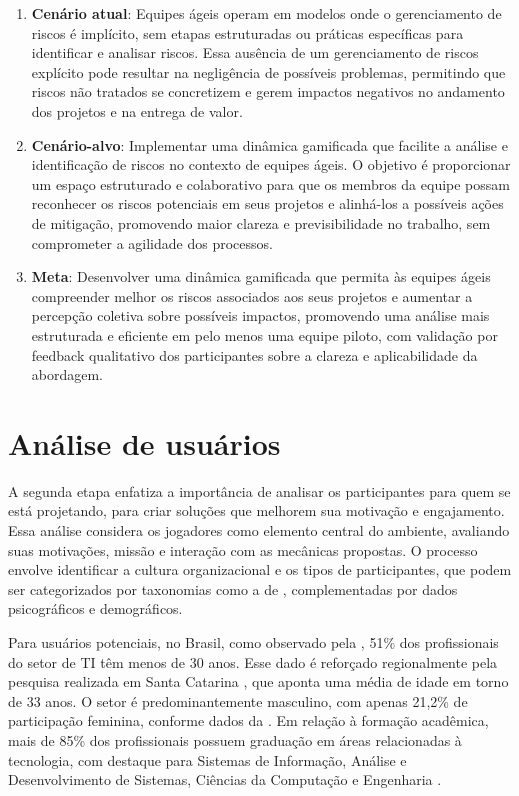 \documentclass[
	12pt,
	openright,
	twoside,
	a4paper,
	english,
	brazil
	]{abntex2}
\begin{document}
\begin{enumerate}
  \item \textbf{Cenário atual}: Equipes ágeis operam em modelos onde o gerenciamento de riscos é implícito, sem etapas estruturadas ou práticas específicas para identificar e analisar riscos. Essa ausência de um gerenciamento de riscos explícito pode resultar na negligência de possíveis problemas, permitindo que riscos não tratados se concretizem e gerem impactos negativos no andamento dos projetos e na entrega de valor. 
  \item \textbf{Cenário-alvo}: Implementar uma dinâmica gamificada que facilite a análise e identificação de riscos no contexto de equipes ágeis. O objetivo é proporcionar um espaço estruturado e colaborativo para que os membros da equipe possam reconhecer os riscos potenciais em seus projetos e alinhá-los a possíveis ações de mitigação, promovendo maior clareza e previsibilidade no trabalho, sem comprometer a agilidade dos processos. 
  \item \textbf{Meta}: Desenvolver uma dinâmica gamificada que permita às equipes ágeis compreender melhor os riscos associados aos seus projetos e aumentar a percepção coletiva sobre possíveis impactos, promovendo uma análise mais estruturada e eficiente em pelo menos uma equipe piloto, com validação por feedback qualitativo dos participantes sobre a clareza e aplicabilidade da abordagem.
\end{enumerate}

\section{Análise de usuários}

A segunda etapa enfatiza a importância de analisar os participantes para quem se está projetando, para criar soluções que melhorem sua motivação e engajamento. Essa análise considera os jogadores como elemento central do ambiente, avaliando suas motivações, missão e interação com as mecânicas propostas. O processo envolve identificar a cultura organizacional e os tipos de participantes, que podem ser categorizados por taxonomias como a de , complementadas por dados psicográficos e demográficos.

Para usuários potenciais, no Brasil, como observado pela , 51\% dos profissionais do setor de TI têm menos de 30 anos. Esse dado é reforçado regionalmente pela pesquisa realizada em Santa Catarina \cite{acate}, que aponta uma média de idade em torno de 33 anos. O setor é predominantemente masculino, com apenas 21,2\% de participação feminina, conforme dados da . Em relação à formação acadêmica, mais de 85\% dos profissionais possuem graduação em áreas relacionadas à tecnologia, com destaque para Sistemas de Informação, Análise e Desenvolvimento de Sistemas, Ciências da Computação e Engenharia \cite{revelo2021tecnologia}.
\end{document}
